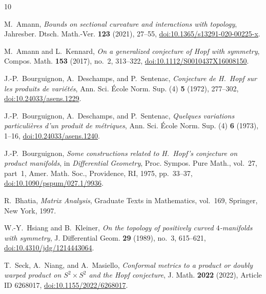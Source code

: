 \documentclass[11pt]{amsart}
\theoremstyle{definition}
\theoremstyle{remark}
\begin{document}
\begin{thebibliography}{10}

M.~Amann,
\emph{Bounds on sectional curvature and interactions with topology},
Jahresber. Dtsch. Math.-Ver. \textbf{123} (2021), 27--55,
\href{https://doi.org/10.1365/s13291-020-00225-x}{doi:10.1365/s13291-020-00225-x}.

M.~Amann and L.~Kennard,
\emph{On a generalized conjecture of Hopf with symmetry},
Compos. Math. \textbf{153} (2017), no.~2, 313--322,
\href{https://doi.org/10.1112/S0010437X16008150}{doi:10.1112/S0010437X16008150}.

J.-P.~Bourguignon, A.~Deschamps, and P.~Sentenac,
\emph{Conjecture de H.~Hopf sur les produits de vari\'et\'es},
Ann. Sci. \'{E}cole Norm. Sup. (4) \textbf{5} (1972), 277--302,
\href{https://doi.org/10.24033/asens.1229}{doi:10.24033/asens.1229}.

J.-P.~Bourguignon, A.~Deschamps, and P.~Sentenac,
\emph{Quelques variations particuli\`eres d'un produit de m\'etriques},
Ann. Sci. \'{E}cole Norm. Sup. (4) \textbf{6} (1973), 1--16,
\href{https://doi.org/10.24033/asens.1240}{doi:10.24033/asens.1240}.

J.-P.~Bourguignon,
\emph{Some constructions related to H.~Hopf's conjecture on product manifolds},
in \emph{Differential Geometry}, Proc. Sympos. Pure Math., vol.~27,
part~1, Amer. Math. Soc., Providence, RI, 1975, pp.~33--37,
\href{https://doi.org/10.1090/pspum/027.1/9936}{doi:10.1090/pspum/027.1/9936}.

R.~Bhatia,
\emph{Matrix Analysis}, Graduate Texts in Mathematics, vol.~169,
Springer, New York, 1997.

W.-Y.~Hsiang and B.~Kleiner,
\emph{On the topology of positively curved $4$-manifolds with symmetry},
J. Differential Geom. \textbf{29} (1989), no.~3, 615--621,
\href{https://doi.org/10.4310/jdg/1214443064}{doi:10.4310/jdg/1214443064}.

T.~Seck, A.~Niang, and A.~Masiello,
\emph{Conformal metrics to a product or doubly warped product on
$S^2\times S^2$ and the Hopf conjecture},
J. Math. \textbf{2022} (2022), Article ID 6268017,
\href{https://doi.org/10.1155/2022/6268017}{doi:10.1155/2022/6268017}.

\end{thebibliography}
\end{document}
